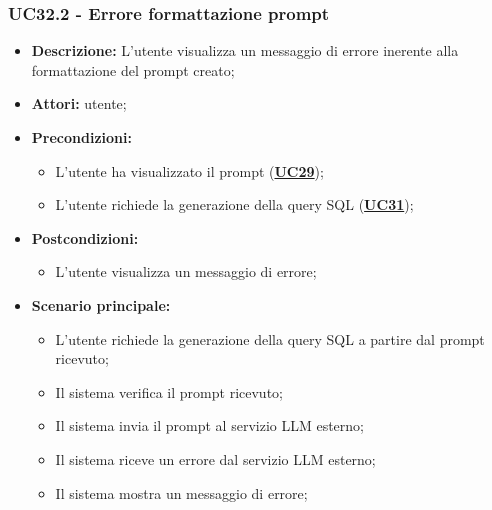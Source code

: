 \subsubsection{UC32.2 - Errore formattazione prompt}
\label{sec:UC32.2}
\begin{itemize}
	\item \textbf{Descrizione:} L'utente visualizza un messaggio di errore inerente alla formattazione del prompt creato;
	\item \textbf{Attori:} utente;
	\item \textbf{Precondizioni:} 
	\begin{itemize}
		\item L'utente ha visualizzato il prompt (\hyperref[sec:UC29]{\textbf{UC29}});
		\item L'utente richiede la generazione della query SQL (\hyperref[sec:UC31]{\textbf{UC31}});
	\end{itemize}
	\item \textbf{Postcondizioni:} 
	\begin{itemize}
		\item L'utente visualizza un messaggio di errore;
	\end{itemize}
	\item \textbf{Scenario principale:}
	\begin{itemize}
		\item L'utente richiede la generazione della query SQL a partire dal prompt ricevuto;
		\item Il sistema verifica il prompt ricevuto;
		\item Il sistema invia il prompt al servizio LLM esterno;
		\item Il sistema riceve un errore dal servizio LLM esterno;
		\item Il sistema mostra un messaggio di errore;
	\end{itemize}
\end{itemize}


